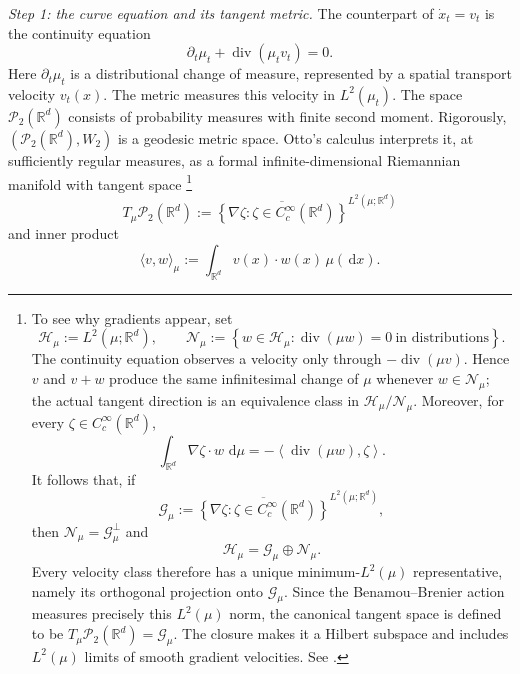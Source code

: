 \documentclass[11pt]{amsart}
\numberwithin{equation}{section}
\theoremstyle{plain}
\newcommand{\R}{\mathbb{R}}
\newcommand{\cP}{\mathcal{P}}
\newcommand{\dd}{\,\mathrm{d}}
\DeclareMathOperator{\diver}{div}
\begin{document}
\emph{Step 1: the curve equation and its tangent metric.}
The counterpart of $\dot x_t=v_t$ is the continuity equation
\[
 \partial_t\mu_t+\diver(\mu_t v_t)=0.
\]
Here $\partial_t\mu_t$ is a distributional change of measure, represented
by a spatial transport velocity $v_t(x)$.  The metric measures this velocity
in $L^2(\mu_t)$.
The space $\cP_2(\R^d)$ consists of probability measures with finite second
moment. Rigorously, $(\cP_2(\R^d),W_2)$ is a geodesic metric space.
Otto's calculus interprets it, at sufficiently regular measures, as a formal
infinite-dimensional Riemannian manifold with tangent space
\footnote{
To see why gradients appear, set
\[
 \mathcal H_\mu:=L^2(\mu;\R^d),
 \qquad
 \mathcal N_\mu
 :=\left\{w\in\mathcal H_\mu:
          \diver(\mu w)=0\ \text{in distributions}\right\}.
\]
The continuity equation observes a velocity only through
$-\diver(\mu v)$.  Hence $v$ and $v+w$ produce the same infinitesimal
change of $\mu$ whenever $w\in\mathcal N_\mu$; the actual tangent direction
is an equivalence class in $\mathcal H_\mu/\mathcal N_\mu$.  Moreover, for
every $\zeta\in C_c^\infty(\R^d)$,
\[
 \int_{\R^d}\nabla\zeta\cdot w\,\dd\mu
 =-\left\langle\diver(\mu w),\zeta\right\rangle.
\]
It follows that, if
\[
 \mathcal G_\mu
 :=\overline{\left\{\nabla\zeta:
          \zeta\in C_c^\infty(\R^d)\right\}}^{L^2(\mu;\R^d)},
\]
then $\mathcal N_\mu=\mathcal G_\mu^\perp$ and
\[
 \mathcal H_\mu=\mathcal G_\mu\oplus\mathcal N_\mu.
\]
Every velocity class therefore has a unique minimum-$L^2(\mu)$ representative,
namely its orthogonal projection onto $\mathcal G_\mu$.  Since the
Benamou--Brenier action measures precisely this $L^2(\mu)$ norm, the
canonical tangent space is defined to be
$T_\mu\cP_2(\R^d)=\mathcal G_\mu$.  The closure makes it a Hilbert subspace
and includes $L^2(\mu)$ limits of smooth gradient velocities.  See
\cite[Definition~8.4.1, Lemma~8.4.2, and Remark~8.4.4]
{AmbrosioGigliSavare2008}.
}
\[
 T_\mu\cP_2(\R^d)
 :=\overline{\left\{\nabla\zeta:\zeta\in C_c^\infty(\R^d)\right\}}
 ^{L^2(\mu;\R^d)}
\]
and inner product
\[
\langle v,w\rangle_\mu
 :=\int_{\R^d}v(x)\cdot w(x)\,\mu(\dd x).
\]
\end{document}
